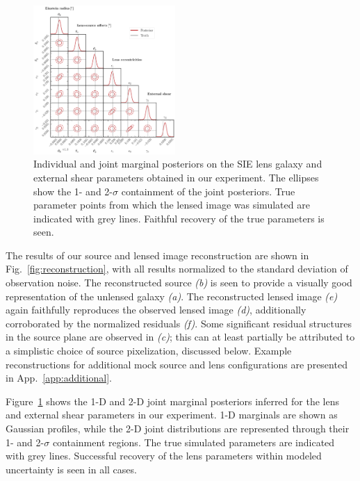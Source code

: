 \documentclass[nohyperref]{article}
\theoremstyle{plain}
\theoremstyle{definition}
\theoremstyle{remark}
\begin{document}
\begin{figure}[!ht]
\centering
\includegraphics[width=0.48\textwidth]{figures/joint_lens.pdf}
\vspace{-1em}
\caption{Individual and joint marginal posteriors on the SIE lens galaxy and external shear parameters obtained in our experiment. The ellipses show the 1- and 2-$\sigma$ containment of the joint posteriors. True parameter points from which the lensed image was simulated are indicated with grey lines. Faithful recovery of the true parameters is seen.}\label{fig:joint_lens}
\vspace{-0.5em}
\end{figure}
The results of our source and lensed image reconstruction are shown in Fig.~\ref{fig:reconstruction}, with all results normalized to the standard deviation of observation noise. The reconstructed source \emph{(b)} is seen to provide a visually good representation of the unlensed galaxy \emph{(a)}. The reconstructed lensed image \emph{(e)} again faithfully reproduces the observed lensed image \emph{(d)}, additionally corroborated by the normalized residuals \emph{(f)}. Some significant residual structures in the source plane are observed in \emph{(c)}; this can at least partially be attributed to a simplistic choice of source pixelization, discussed below. Example reconstructions for additional mock source and lens configurations are presented in App.~\ref{app:additional}.

Figure~\ref{fig:joint_lens} shows the 1-D and 2-D joint marginal posteriors inferred for the lens and external shear parameters in our experiment. 1-D marginals are shown as Gaussian profiles, while the 2-D joint distributions are represented through their 1- and 2-$\sigma$ containment regions. The true simulated parameters are indicated with grey lines. Successful recovery of the lens parameters within modeled uncertainty is seen in all cases.
\end{document}
